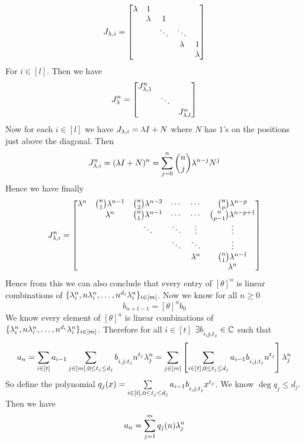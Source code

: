 \documentclass[a4paper, 11pt]{article}
\begin{document}
{\begin{itemize}[label=$\bullet$]
$$J_{\lambda,i}=\left[\begin{matrix}\lambda & 1   &        & & \\
				 	 & \lambda & 1      & &\\
			 	     &     & \ddots & \ddots &\\
		 	        &      &        &        \lambda& 1\\
	 	          &       &        &         & \lambda\end{matrix}\right]$$For $i\in[l]$. Then we have $$J_{\lambda}^n=\left[\begin{matrix}J_{\lambda,1}^n & & \\ & \ddots & \\ & & J_{\lambda,l}^n\end{matrix}\right]$$Now for each $i\in[l]$ we have $J_{\lambda,i}=\lambda I+N$ where $N$ has $1$'s on the positions just above the diagonal. Then $$J^n_{\lambda,i}=(\lambda I+N)^n=\sum\limits_{j=0}^n \binom{n}{j}\lambda^{n-j}N^j$$Hence we have finally 
$$J^n_{\lambda,i}=\left[\begin{matrix}  \lambda^n & \binom{n}{1}\lambda^{n-1} & \binom{n}{2}\lambda^{n-2} & \cdots & \cdots & \binom{n}{p}\lambda^{n-p}\\
                           & \lambda^n & \binom{n}{1}\lambda^{n-1} & \cdots & \cdots & \binom{n}{p-1}\lambda^{n-p+1}\\
                           &                       & \ddots                & \ddots & \vdots & \vdots\\
                           &                       &                       & \ddots & \ddots & \vdots \\
                           &                       &                       &        &  \lambda^n & \binom{n}{1}\lambda^{n-1}\\
                           &                       &                       &        &        & \lambda^n\end{matrix}\right] $$Hence from this we can also conclude that every entry of $[\theta]^n$ is linear combinations of $\{\lambda_i^n,n\lambda_i^n,\dots, n^{d_i}\lambda_i^n\}_{i\in[m]}$.                     Now we know for all $n\geq 0$ $$b_{n+t-1}=[\theta]^n b_0$$We know every element of $[\theta]^n$ is linear combinations of $\{\lambda_i^n,n\lambda_i^n,\dots, n^{d_i}\lambda_i^n\}_{i\in[m]}$. Therefore for all $i\in[t]$ $\exists b\strut_{i,j,t_j}\in\mathbb{C}$ such that $$a_n=\sum_{i\in[t]} a_{i-1}\sum\limits_{j\in[m],0\leq t_j\leq d_j}b\strut_{i,j,t_j}n^{t_j}\lambda_j^n=\sum_{j\in[m]} \left[\sum\limits_{i\in[t],0\leq t_j\leq d_j}a_{i-1}b\strut_{i,j,t_j}n^{t_j}\right]\lambda_j^n$$So define the polynomial $q_j(x)=\sum\limits_{i\in[t],0\leq t_j\leq d_j}a_{i-1}b\strut_{i,j,t_j}x^{t_j}$. We know $\deg q_j\leq d_j$. Then we have $$a_n= \sum_{j=1}^m q_j(n)\lambda_j^n$$\parinn
                       

\end{itemize}}
\end{document}
